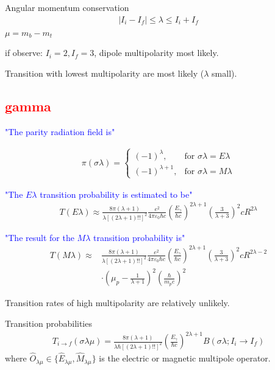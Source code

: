 \documentclass[twoside,english]{uiofysmaster/uiofysmaster}
\begin{document}
Angular momentum conservation
\begin{align}
 	| I_i - I_f | \leq \lambda \leq I_i + I_f 
\end{align}
$\mu = m_b - m_t$

if observe: $I_i = 2, I_f = 3$, dipole multipolarity most likely. 

Transition with lowest multipolarity are most likely ($\lambda$ small).


\subsection{\textcolor{red}{gamma}}

\textcolor{blue}{"The parity radiation field is"} \cite{Krane}

\begin{align}
	\pi (\sigma \lambda) =
    \begin{cases}
    		(-1)^\lambda, & \text{for } \sigma \lambda = E\lambda \\
    		(-1)^{\lambda + 1}, & \text{for } \sigma \lambda = M\lambda
    \end{cases}
\end{align}

\textcolor{blue}{"The $E\lambda$ transition probability is estimated to be"} \cite{Krane}
\begin{align}
	T(E\lambda) \approx \frac{8\pi (\lambda + 1)}{\lambda [(2\lambda + 1)!!]^2} \frac{e^2}{4\pi \varepsilon_0 \hbar c} \left( \frac{E_\gamma}{\hbar c} \right)^{2\lambda + 1} \left( \frac{3}{\lambda + 3} \right)^2 c R^{2\lambda}
\end{align}

\textcolor{blue}{"The result for the $M\lambda$ transition probability is"} \cite{Krane}
\begin{align}
	T(M\lambda) \approx & \frac{8\pi (\lambda + 1)}{\lambda [(2\lambda + 1)!!]^2} \frac{e^2}{4\pi \varepsilon_0 \hbar c} \left( \frac{E_\gamma}{\hbar c} \right)^{2\lambda + 1} \left( \frac{3}{\lambda + 3} \right)^2 c R^{2\lambda - 2} \nonumber \\
 & \cdot \left( \mu_p - \frac{1}{\lambda + 1} \right)^2 \left( \frac{\hbar}{m_p c} \right)^2
\end{align}


Transition rates of high multipolarity are relatively unlikely.

Transition probabilities
\begin{align}
	T_{i \rightarrow f} (\sigma \lambda \mu) = \frac{8\pi (\lambda + 1)}{\lambda \hbar [(2\lambda + 1)!!]^2} \left( \frac{E_\gamma}{\hbar c} \right)^{2\lambda + 1} B(\sigma \lambda; I_i \rightarrow I_f)
\end{align}
where $\hat{O}_{\lambda \mu} \in \{ \hat{E}_{\lambda \mu}, \hat{M}_{\lambda \mu} \}$ is the electric or magnetic multipole operator.
\end{document}
